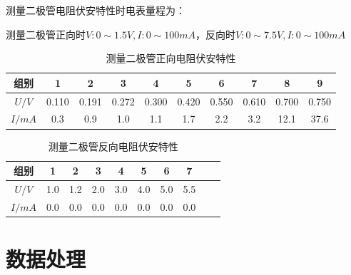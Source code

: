 \documentclass[UTF8]{ctexart}
\begin{document}
测量二极管电阻伏安特性时电表量程为：

测量二极管正向时$V:0 \sim 1.5V,I:0 \sim 100 mA$，反向时$V:0 \sim 7.5V,I:0 \sim 100 mA$
\begin{table}[H]
    \centering
    \caption{测量二极管正向电阻伏安特性}
    \begin{tabular}{|c|c|c|c|c|c|c|c|c|c|}
    \hline
      组别   & 1 & 2 & 3 & 4 & 5 & 6 & 7  & 8 & 9 \\
    \hline
       $U/V$  &  0.110  &  0.191  &   0.272  &  0.300  &  0.420 &  0.550  &  0.610  &  0.700  &  0.750          \\
    \hline
       $I/mA$ & 0.3  &  0.9   &  1.0  &  1.1  &  1.7  &  2.2  & 3.2  &  12.1  &  37.6   \\
    \hline
    \end{tabular}
\end{table}

\begin{table}[H]
    \centering
    \caption{测量二极管反向电阻伏安特性}
    \begin{tabular}{|c|c|c|c|c|c|c|c|c|c|}
    \hline
      组别   & 1 & 2 & 3 & 4 & 5 & 6 & 7   \\
    \hline
       $U/V$  &  1.0  &1.2 &  2.0   & 3.0  &  4.0  & 5.0  &  5.5        \\
    \hline
       $I/mA$ &   0.0  & 0.0  & 0.0  & 0.0  & 0.0  & 0.0  & 0.0 \\
    \hline
    \end{tabular}
\end{table}




\section{数据处理}
\end{document}
